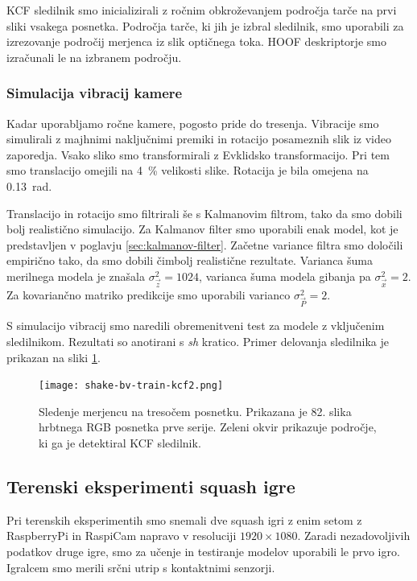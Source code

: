 KCF sledilnik smo inicializirali z ročnim obkroževanjem področja tarče na prvi sliki vsakega posnetka. Področja tarče, ki jih je izbral sledilnik, smo uporabili za izrezovanje področij merjenca iz slik optičnega toka. HOOF deskriptorje smo izračunali le na izbranem področju. 



\subsubsection{Simulacija vibracij kamere}
Kadar uporabljamo ročne kamere, pogosto pride do tresenja. Vibracije smo simulirali z majhnimi naključnimi premiki in rotacijo posameznih slik iz video zaporedja. Vsako sliko smo transformirali z Evklidsko transformacijo. Pri tem smo translacijo omejili na \SI{4}{\%} velikosti slike. Rotacija je bila omejena na \SI{0.13}{rad}. 

Translacijo in rotacijo smo filtrirali še s Kalmanovim filtrom, tako da smo dobili bolj realistično simulacijo. Za Kalmanov filter smo uporabili enak model, kot je predstavljen v poglavju \ref{sec:kalmanov-filter}. Začetne variance filtra smo določili empirično tako, da smo dobili čimbolj realistične rezultate. Varianca šuma merilnega modela je znašala $\sigma_\vec{z}^2=1024$, varianca šuma modela gibanja pa $\sigma_\vec{x}^2=2$. Za kovariančno matriko predikcije smo uporabili varianco $\sigma_\vec{P}^2=2$.

S simulacijo vibracij smo naredili obremenitveni test za modele z vključenim sledilnikom. Rezultati so anotirani s \textit{sh} kratico. Primer delovanja sledilnika je prikazan na sliki \ref{fig:vibracije}.

\begin{figure}[!htb]
	\centering
	\texttt{[image: shake-bv-train-kcf2.png]}
	\caption[Sledenje merjencu na tresočem posnetku]{Sledenje merjencu na tresočem posnetku. Prikazana je 82. slika hrbtnega RGB posnetka prve serije. Zeleni okvir prikazuje področje, ki ga je detektiral KCF sledilnik.}
	\label{fig:vibracije}
\end{figure} 








\subsection{Terenski eksperimenti squash igre}
Pri terenskih eksperimentih smo snemali dve squash igri z enim setom z RaspberryPi in RaspiCam napravo v resoluciji  $1920 \times 1080$. Zaradi nezadovoljivih podatkov druge igre, smo za učenje in testiranje modelov uporabili le prvo igro. Igralcem smo merili srčni utrip s kontaktnimi senzorji. 

